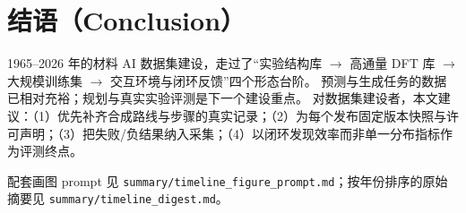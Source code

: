 \documentclass[11pt,a4paper]{ctexart}
\begin{document}
\section{结语（Conclusion）}

1965--2026 年的材料 AI 数据集建设，走过了``实验结构库 $\to$ 高通量 DFT 库 $\to$ 大规模训练集 $\to$ 交互环境与闭环反馈''四个形态台阶。
预测与生成任务的数据已相对充裕；规划与真实实验评测是下一个建设重点。
对数据集建设者，本文建议：（1）优先补齐合成路线与步骤的真实记录；（2）为每个发布固定版本快照与许可声明；（3）把失败/负结果纳入采集；（4）以闭环发现效率而非单一分布指标作为评测终点。

配套画图 prompt 见 \texttt{summary/timeline\_figure\_prompt.md}；按年份排序的原始摘要见 \texttt{summary/timeline\_digest.md}。
\end{document}
